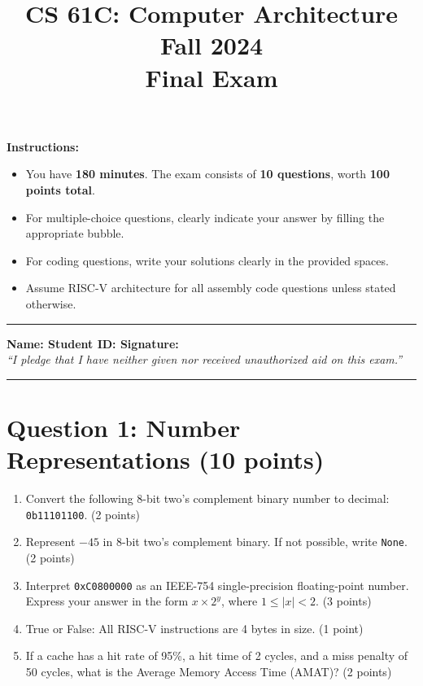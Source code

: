 \documentclass[11pt]{article}
\title{CS 61C: Computer Architecture \\
Fall 2024 \\
\textbf{Final Exam}}
\author{}
\date{}
\begin{document}
\maketitle
\thispagestyle{empty}

\textbf{Instructions:}
\begin{itemize}[noitemsep]
    \item You have \textbf{180 minutes}. The exam consists of \textbf{10 questions}, worth \textbf{100 points total}.
    \item For multiple-choice questions, clearly indicate your answer by filling the appropriate bubble.
    \item For coding questions, write your solutions clearly in the provided spaces.
    \item Assume RISC-V architecture for all assembly code questions unless stated otherwise.
\end{itemize}

\hrule
\vspace{0.2cm}

\textbf{Name: \hfill Student ID: \hfill Signature:} \\
\textit{``I pledge that I have neither given nor received unauthorized aid on this exam.''}

\vspace{0.2cm}
\hrule

\section*{Question 1: Number Representations (10 points)}
\begin{enumerate}[label=\textbf{Q1.\arabic*}]
    \item Convert the following 8-bit two's complement binary number to decimal: \texttt{0b11101100}. (2 points)
    \item Represent \(-45\) in 8-bit two's complement binary. If not possible, write \texttt{None}. (2 points)
    \item Interpret \texttt{0xC0800000} as an IEEE-754 single-precision floating-point number. Express your answer in the form \(x \times 2^y\), where \(1 \leq |x| < 2\). (3 points)
    \item True or False: All RISC-V instructions are 4 bytes in size. (1 point)
    \item If a cache has a hit rate of 95\%, a hit time of 2 cycles, and a miss penalty of 50 cycles, what is the Average Memory Access Time (AMAT)? (2 points)
\end{enumerate}
\end{document}
